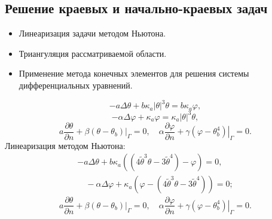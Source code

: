 \subsection{Решение краевых и начально-краевых задач}\label{subsec:solve-direct}
\begin{frame}
    \begin{itemize}
        \item Линеаризация задачи методом Ньютона.
        \item Триангуляция рассматриваемой области.
        \item Применение метода конечных элементов для решения системы дифференциальных уравнений.
    \end{itemize}
    \begin{equation}
        \label{eq:4_1:1}
        -a \Delta \theta+b \kappa_{a}| \theta|^{3} \theta =
        b \kappa_{a} \varphi,
    \end{equation}
    \begin{equation}
        \label{eq:4_1:2}
        -\alpha \Delta \varphi+\kappa_{a} \varphi =
        \kappa_{a}|\theta|^{3} \theta,
    \end{equation}
    \begin{equation}
        \label{eq:4_1:3}
        a \frac{\partial \theta}{\partial n}
        +\left.\beta\left(\theta-\theta_{b}\right)\right|_{\Gamma}=0,
        \quad \alpha \frac{\partial \varphi}{\partial n}
        +\left.\gamma\left(\varphi-\theta_{b}^{4}\right)\right|_{\Gamma}=0.
    \end{equation}
    Линеаризация методом Ньютона:
    \begin{equation}
        \tag{L1}
        \label{eq:L1}
        \begin{gathered}
            -a \Delta \theta+b \kappa_{a}\left(\left(4 \widetilde{\theta}^{3}
            \theta-3 \widetilde{\theta}^{4}\right)-\varphi\right)=0,\\
            \quad-\alpha \Delta \varphi
            +\kappa_{a}\left(\varphi
            -\left(4 \widetilde{\theta}^{3}
            \theta-3 \widetilde{\theta}^{4}\right)\right)=0;
        \end{gathered}
    \end{equation}
    \begin{equation}
        \tag{L2}
        \label{eq:L2}
        a \frac{\partial \theta}{\partial n}
        +\left.\beta\left(\theta-\theta_{b}\right)\right|_{\Gamma}=0,
        \quad \alpha \frac{\partial \varphi}{\partial n}
        +\left.\gamma\left(\varphi-\theta_{b}^{4}\right)\right|_{\Gamma}=0.
    \end{equation}
\end{frame}

